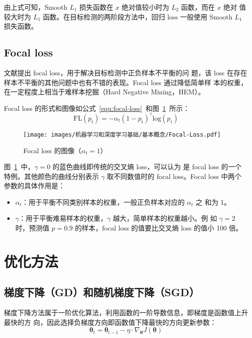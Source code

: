 由上式可知，Smooth $L_1$ 损失函数在 $x$ 绝对值较小时为 $L_2$ 函数，而在 $x$ 绝对
值较大时为 $L_1$ 函数。在目标检测的两阶段方法中，回归 loss 一般使用 Smooth $L_1$
损失函数。

\subsection{Focal loss}

文献提出 focal loss，用于解决目标检测中正负样本不平衡的问
题，该 loss 在存在样本不平衡的其他问题中也有不错的表现。Focal loss 通过降低简单样
本的权重，在一定程度上相当于难样本挖掘（Hard Negative Mining，HEM）。

Focal loss 的形式和图像如公式~\ref{equ:focal-loss}~和图~\ref{fig:focal-loss}~所示：
\begin{equation}
  \label{equ:focal-loss}
  \mathrm{FL}(p_{\mathrm{t}}) = - \alpha_t (1-p_{\mathrm{t}})^{\gamma} \mathrm{log}(p_{\mathrm{t}})
\end{equation}

\begin{figure}[ht]
  \centering
  \texttt{[image: images/机器学习和深度学习基础/基本概念/Focal-Loss.pdf]}
  \caption{Focal loss 的图像（$\alpha_t = 1$）}
  \label{fig:focal-loss}
\end{figure}

图~\ref{fig:focal-loss}~中，$\gamma = 0$ 的蓝色曲线即传统的交叉熵 loss，可以认为
是 focal loss 的一个特例。其他颜色的曲线分别表示 $\gamma$ 取不同数值时的 focal
loss。Focal loss 中两个参数的具体作用是：

\begin{itemize}
  \item $\alpha_t$：用于平衡不同类别样本的权重，一般正负样本对应的 $\alpha_t$ 之
    和为 1。
  \item $\gamma$：用于平衡难易样本的权重，$\gamma$ 越大，简单样本的权重越小。例
    如 $\gamma = 2$ 时，预测值 $p = 0.9$ 的样本，focal loss 的值要比交叉熵 loss
    的值小 100 倍。
\end{itemize}

\section{优化方法}
\label{sec:opt}

\subsection{梯度下降（GD）和随机梯度下降（SGD）}
梯度下降方法属于一阶优化算法，利用函数的一阶导数信息，即梯度是函数值上升最快的方
向，因此选择负梯度方向即函数值下降最快的方向更新参数：
\begin{equation}
  \boldsymbol{\theta}_t = \boldsymbol{\theta}_{t-1} - \eta \cdot \nabla_{\boldsymbol{\theta}}J(\boldsymbol{\theta})
\end{equation}

